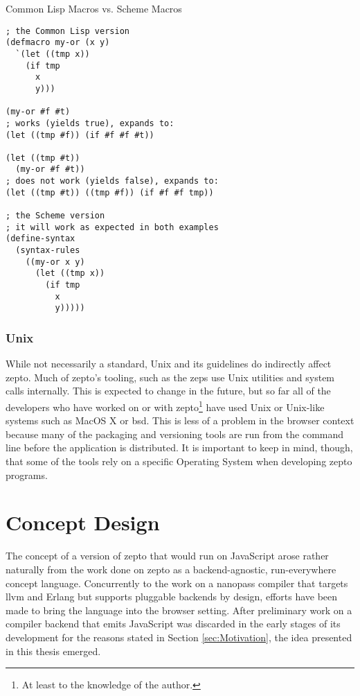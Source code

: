 \documentclass[oneside,11pt,xetex]{scrbook}
\begin{document}
\begin{listing}[H]
\caption{Common Lisp Macros vs. Scheme Macros}
\begin{verbatim}
; the Common Lisp version
(defmacro my-or (x y)
  `(let ((tmp x))
    (if tmp
      x
      y)))

(my-or #f #t)
; works (yields true), expands to:
(let ((tmp #f)) (if #f #f #t))

(let ((tmp #t))
  (my-or #f #t))
; does not work (yields false), expands to:
(let ((tmp #t)) ((tmp #f)) (if #f #f tmp))

; the Scheme version
; it will work as expected in both examples
(define-syntax
  (syntax-rules
    ((my-or x y)
      (let ((tmp x))
        (if tmp
          x
          y)))))
\end{verbatim}
\label{fig:schemevscomlisp}
\end{listing}

\subsection{Unix}

While not necessarily a standard, Unix and its guidelines do indirectly affect zepto. Much of zepto's
tooling, such as the \gls{zeps} use Unix utilities and system calls internally. This is expected to change
in the future, but so far all of the developers who have worked on or with zepto\footnote{At least to the knowledge
of the author.} have used Unix or Unix-like systems such as MacOS X or \gls{bsd}. This is less of a problem in the
browser context because many of the packaging and versioning tools are run from the command line before the application
is distributed. It is important to keep in mind, though, that some of the tools rely on a specific Operating System when
developing zepto programs.

\chapter{Concept Design}
\label{chap:ConceptDesign}

The concept of a version of zepto that would run on JavaScript arose rather
naturally from the work done on zepto as a backend-agnostic, run-everywhere
concept language. Concurrently to the work on a nanopass compiler that
targets \gls{llvm} and Erlang but supports pluggable backends by design, efforts
have been made to bring the language into the browser setting. After preliminary
work on a compiler backend that emits JavaScript was discarded in the
early stages of its development for the reasons stated in Section \ref{sec:Motivation},
the idea presented in this thesis emerged.
\end{document}
